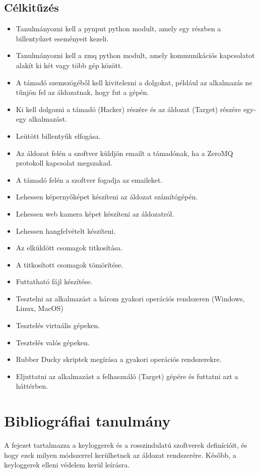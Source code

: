 \documentclass[12pt,a4paper,oneside]{report}
\begin{document}
\section{Célkitűzés}
\begin{itemize}
\item Tanulmányozni kell a pynput python modult, amely egy részben a billentyűzet eseményeit kezeli.
\item Tanulmányozni kell a zmq python modult, amely kommunikációs kapcsolatot alakít ki két vagy több gép között.
\item A támadó szemszögéből kell kivitelezni a dolgokat, például az alkalmazás ne tűnjön fel az áldozatnak, hogy fut a gépén.
\item Ki kell dolgozni a támadó (Hacker) részére és az áldozat (Target) részére egy-egy alkalmazást.
\item Leütött billentyűk elfogása.
\item Az áldozat felén a szoftver küldjön emailt a támadónak, ha a ZeroMQ protokoll kapcsolat megszakad.
\item A támadó felén a szoftver fogadja az emaileket.
\item Lehessen képernyőképet készíteni az áldozat számítógépén.
\item Lehessen web kamera képet készíteni az áldozatról.
\item Lehessen hangfelvételt készíteni.
\item Az elküldött csomagok titkosítása.
\item A titkosított csomagok tömörítése.
\item Futtatható fájl készítése.
\item Tesztelni az alkalmazást a három gyakori operációs rendszeren (Windows, Linux, MacOS)
\item Tesztelés virtuális gépeken.
\item Tesztelés valós gépeken.
\item Rubber Ducky skriptek megírása a gyakori operációs rendszerekre.
\item Eljuttatni az alkalmazást a felhasználó (Target) gépére és futtatni azt a háttérben.
\end{itemize}


\chapter{Bibliográfiai tanulmány}\label{sec:bibl}
A fejezet tartalmazza a keyloggerek és a rosszindulatú szoftverek definícióit, és hogy ezek milyen módszerrel kerülhetnek az áldozat rendszerére. Később, a keyloggerek elleni védelem kerül leírásra.
\end{document}
